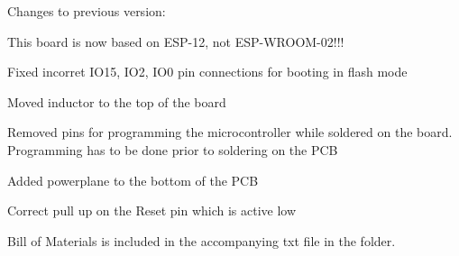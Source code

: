 Changes to previous version\+:


\begin{DoxyItemize}
\item This board is now based on E\+S\+P-\/12, not E\+S\+P-\/\+W\+R\+O\+O\+M-\/02!!!
\item Fixed incorret I\+O15, I\+O2, I\+O0 pin connections for booting in flash mode
\item Moved inductor to the top of the board
\item Removed pins for programming the microcontroller while soldered on the board. Programming has to be done prior to soldering on the P\+CB
\item Added powerplane to the bottom of the P\+CB
\item Correct pull up on the Reset pin which is active low
\end{DoxyItemize}

Bill of Materials is included in the accompanying txt file in the folder. 